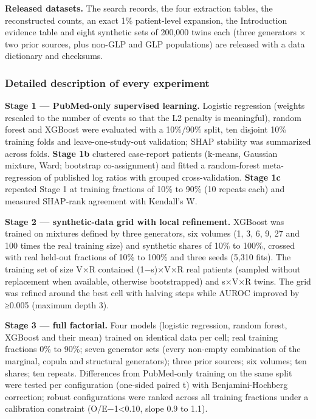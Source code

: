 \documentclass[
  11pt,
]{article}
\begin{document}
\textbf{Released datasets.} The search records, the four extraction
tables, the reconstructed counts, an exact 1\% patient-level expansion,
the Introduction evidence table and eight synthetic sets of 200,000
twins each (three generators × two prior sources, plus non-GLP and GLP
populations) are released with a data dictionary and checksums.

\subsubsection{Detailed description of every
experiment}\label{detailed-description-of-every-experiment}

\textbf{Stage 1 --- PubMed-only supervised learning.} Logistic
regression (weights rescaled to the number of events so that the L2
penalty is meaningful), random forest and XGBoost were evaluated with a
10\%/90\% split, ten disjoint 10\% training folds and
leave-one-study-out validation; SHAP stability was summarized across
folds. \textbf{Stage 1b} clustered case-report patients (k-means,
Gaussian mixture, Ward; bootstrap co-assignment) and fitted a
random-forest meta-regression of published log ratios with grouped
cross-validation. \textbf{Stage 1c} repeated Stage 1 at training
fractions of 10\% to 90\% (10 repeats each) and measured SHAP-rank
agreement with Kendall's W.

\textbf{Stage 2 --- synthetic-data grid with local refinement.} XGBoost
was trained on mixtures defined by three generators, six volumes (1, 3,
6, 9, 27 and 100 times the real training size) and synthetic shares of
10\% to 100\%, crossed with real held-out fractions of 10\% to 100\% and
three seeds (5,310 fits). The training set of size V×R contained
(1−s)×V×R real patients (sampled without replacement when available,
otherwise bootstrapped) and s×V×R twins. The grid was refined around the
best cell with halving steps while AUROC improved by ≥0.005 (maximum
depth 3).

\textbf{Stage 3 --- full factorial.} Four models (logistic regression,
random forest, XGBoost and their mean) trained on identical data per
cell; real training fractions 0\% to 90\%; seven generator sets (every
non-empty combination of the marginal, copula and structural
generators); three prior sources; six volumes; ten shares; ten repeats.
Differences from PubMed-only training on the same split were tested per
configuration (one-sided paired t) with Benjamini-Hochberg correction;
robust configurations were ranked across all training fractions under a
calibration constraint (\textbar O/E−1\textbar\textless0.10, slope 0.9
to 1.1).
\end{document}
